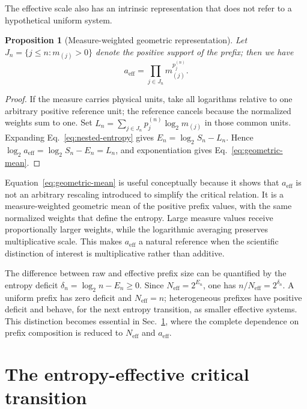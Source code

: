 \documentclass[aip,cha,reprint,superscriptaddress,floatfix]{revtex4-2}
\newtheorem{proposition}[theorem]{Proposition}
\theoremstyle{definition}
\theoremstyle{remark}
\newcommand{\Neff}{N_{\mathrm{eff}}}
\newcommand{\aeff}{a_{\mathrm{eff}}}
\begin{document}
The effective scale also has an intrinsic representation that does not refer to a hypothetical
uniform system.

\begin{proposition}[Measure-weighted geometric representation]
\label{prop:geometric-mean}
Let \(J_n=\{j\le n:m_{(j)}>0\}\) denote the positive support of the prefix; then we have
\begin{equation}
\aeff
=
\prod_{j\in J_n}m_{(j)}^{p_j^{(n)}}.
\label{eq:geometric-mean}
\end{equation}
\end{proposition}

\begin{proof}
If the measure carries physical units, take all logarithms relative to one arbitrary positive reference unit; the reference cancels because the normalized weights sum to one. Set \(L_n=\sum_{j\in J_n}p_j^{(n)}\log_2m_{(j)}\) in those common units. Expanding Eq.~\eqref{eq:nested-entropy} gives \(E_n=\log_2S_n-L_n\). Hence \(\log_2\aeff=\log_2S_n-E_n=L_n\), and exponentiation gives Eq.~\eqref{eq:geometric-mean}.
\end{proof}

Equation~\eqref{eq:geometric-mean} is useful conceptually because it shows that \(\aeff\) is not an arbitrary rescaling introduced to simplify the critical relation. It is a measure-weighted geometric mean of the positive prefix values, with the same normalized weights that define the entropy. Large measure values receive proportionally larger weights, while the logarithmic averaging preserves multiplicative scale. This makes \(\aeff\) a natural reference when the scientific distinction of interest is multiplicative rather than additive.

The difference between raw and effective prefix size can be quantified by the entropy deficit \(\delta_n=\log_2n-E_n\ge0\). Since \(\Neff=2^{E_n}\), one has \(n/\Neff=2^{\delta_n}\). A uniform prefix has zero deficit and \(\Neff=n\); heterogeneous prefixes have positive deficit and behave, for the next entropy transition, as smaller effective systems. This distinction becomes essential in Sec.~\ref{sec:critical}, where the complete dependence on prefix composition is reduced to \(\Neff\) and \(\aeff\).

\section{The entropy-effective critical transition}
\label{sec:critical}
\end{document}
